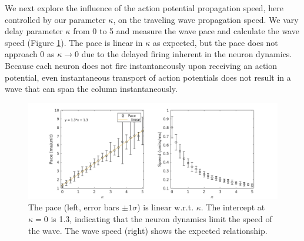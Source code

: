 \documentclass[12pt]{article}
\begin{document}
\FloatBarrier

We next explore the influence of the action potential propagation speed, here controlled by our parameter $\kappa$, on the traveling wave propagation speed.
We vary delay parameter $\kappa$ from 0 to 5 and measure the wave pace and calculate the wave speed (Figure \ref{fig:delay_speed}).
The pace is linear in $\kappa$ as expected, but the pace does not approach $0$ as $\kappa \rightarrow 0$ due to the delayed firing inherent in the neuron dynamics.
Because each neuron does not fire instantaneously upon receiving an action potential, even instantaneous transport of action potentials does not result in a wave that can span the column instantaneously.
\begin{figure}[!htb]
 \caption{The pace (left, error bars $\pm 1 \sigma$) is linear w.r.t. $\kappa$. The intercept at $\kappa=0$ is 1.3, indicating that the neuron dynamics limit the speed of the wave. The wave speed (right) shows the expected relationship. }
 \label{fig:delay_speed}
 \centering
   \includegraphics[width=\textwidth]{fig/WaveSpeed_Delay}
\end{figure}
\FloatBarrier
\end{document}
